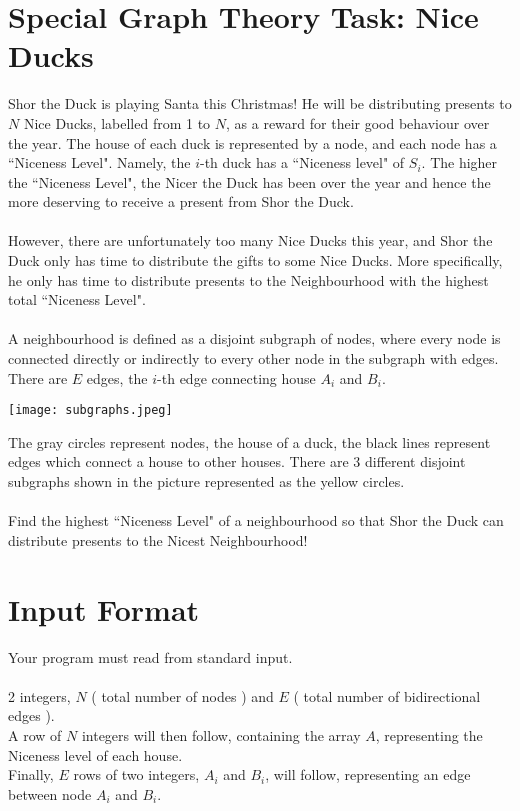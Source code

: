 \documentclass{report}
\begin{document}
\section*{Special Graph Theory Task: Nice Ducks}
Shor the Duck is playing Santa this Christmas! He will be distributing presents to $N$ Nice Ducks, labelled from 1 to $N$, as a reward for their good behaviour over the year. The house of each duck is represented by a node, and each node has a ``Niceness Level". Namely, the $i$-th duck has a ``Niceness level" of $S_i$. The higher the ``Niceness Level", the Nicer the Duck has been over the year and hence the more deserving to receive a present from Shor the Duck. 
\\\\
However, there are unfortunately too many Nice Ducks this year, and Shor the Duck only has time to distribute the gifts to some Nice Ducks. More specifically, he only has time to distribute presents to the Neighbourhood with the highest total ``Niceness Level". 
\\\\
A neighbourhood is defined as a disjoint subgraph of nodes, where every node is connected directly or indirectly to every other node in the subgraph with edges. There are $E$ edges, the $i$-th edge connecting house $A_i$ and $B_i$.
    
\begin{center}
    \texttt{[image: subgraphs.jpeg]}
\end{center}

The gray circles represent nodes, the house of a duck, the black lines represent edges which connect a house to other houses. There are 3 different disjoint subgraphs shown in the picture represented as the yellow circles.
\\\\
Find the highest ``Niceness Level" of a neighbourhood so that Shor the Duck can distribute presents to the Nicest Neighbourhood!

\section*{Input Format}
Your program must read from standard input.
\\\\
2 integers, $N$ ( total number of nodes ) and $E$ ( total number of bidirectional edges ).
\\
A row of $N$ integers will then follow, containing the array $A$, representing the Niceness level of each house.
\\
Finally, $E$ rows of two integers, $A_i$ and $B_i$, will follow, representing an edge between node $A_i$ and $B_i$.
\end{document}
